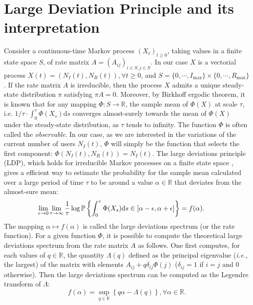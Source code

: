 \documentclass[twoside]{article}
\newcommand{\R}{\mathbb{R}}
\newcommand{\PP}{\mathbb{P}}
\newcommand{\ud}{\textrm{d}}
\begin{document}
\section{Large Deviation Principle and its interpretation}
\label{sec:ldp}
Consider a continuous-time Markov process $(X_t)_{t\ge0}$, taking values in a finite state space $S$, of rate matrix $A = (A_{ij})_{i\in S, j\in S}$.  In our case $X$ is a vectorial process $X(t) = \left( N_I(t), N_R(t)\right), \forall t\ge0$, and $S = \{ 0, \cdots, I_{\textrm{max}} \} \times \{ 0, \cdots, R_{\textrm{max}} \}$. If the rate matrix $A$ is irreducible, then the process $X$ admits a unique steady-state distribution $\pi$ satisfying $\pi A = 0$. Moreover, by Birkhoff ergodic theorem, it is known that for any mapping $\Phi: S \to \R$, the sample mean of $\Phi(X)$ at scale $\tau$, i.e. $1/\tau\cdot\int_{0}^{\tau} \Phi(X_s) \ud s$  converges almost-surely towards the mean of $\Phi(X)$ under the steady-state distribution, as $\tau$ tends to infinity. The function $\Phi$ is often called the \emph{observable}. In our case, as we are interested in the variations of the current number of users $N_I(t)$, $\Phi$ will simply be the function that selects the first component: $\Phi(N_I(t), N_R(t)) = N_I(t)$. 
The large deviations principle (LDP), which holds for irreducible Markov processes on a finite state space \cite{Varadhan08a}, gives a efficient way to estimate the probability for the sample mean calculated over a large period of time $\tau$ to be around a value $\alpha\in\R$ that deviates from the almost-sure mean:
\begin{equation}
\hspace*{-6mm} \lim_{\epsilon\to0} \lim_{\tau\to\infty} \frac{1}{\tau} \log \PP \left\{  \int_{0}^{\tau} \Phi(X_s) \ud s \in [\alpha - \epsilon, \alpha+\epsilon]  \right\} = f(\alpha).
\label{eq:LD-proba}
\end{equation}
The mapping $\alpha\mapsto f(\alpha)$ is called the large deviations spectrum (or the rate function). For a given function $\Phi$, it is possible to compute the theoretical large deviations spectrum from the rate matrix $A$ as follows. One first computes, for each values of $q\in\R$, the quantity $\Lambda (q)$ defined as the principal eigenvalue (\emph{i.e.,} the largest) of the matrix with elements $A_{ij}+q \delta_{ij}\Phi(j)$ ($\delta_{ij}=1$ if $i=j$ and 0 otherwise). Then the large deviations spectrum can be computed as the Legendre transform of $\Lambda$: 
\begin{equation}
f(\alpha) = \sup_{q\in\R} \left\{q \alpha - \Lambda (q) \right\}, \forall \alpha\in\R.
\label{eq:sup}
\end{equation}
\end{document}
